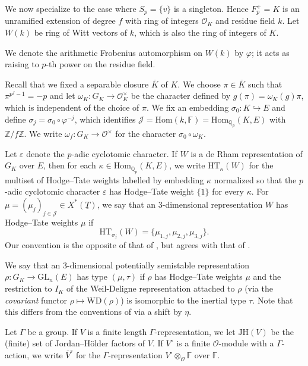 \documentclass[oneside,a4paper,english, 11pt]{amsart}
\theoremstyle{plain}
\theoremstyle{plain}
\theoremstyle{plain}
\theoremstyle{plain}
\theoremstyle{plain}
\theoremstyle{plain}
\theoremstyle{definition}
\theoremstyle{definition}
\theoremstyle{definition}
\theoremstyle{remark}
\numberwithin{equation}{section}
\newcommand{\Z}{\mathbb{Z}}
\newcommand{\Qp}{\mathbb{Q}_p}
\newcommand{\F}{\mathbb{F}}
\newcommand{\cJ}{\mathcal{J}}
\newcommand{\cO}{\mathcal{O}}
\newcommand{\eps}{\varepsilon}
\newcommand{\phz}{\varphi}
\newcommand{\Hom}{\mathrm{Hom}}
\newcommand{\GL}{\mathrm{GL}}
\newcommand{\un}[1]{\underline{#1}}
\newcommand{\JH}{\mathrm{JH}}
\newcommand{\ovl}[1]{\overline{#1}}
\newcommand{\ra}{\rightarrow}
\newcommand{\into}{\hookrightarrow}
\begin{document}
We now specialize to the case where $S_p=\{v\}$ is a singleton.
Hence $F^+_p=K$ is an unramified extension of degree $f$ with ring of integers $\cO_K$ and residue field $k$. 
Let $W(k)$ be ring of Witt vectors of $k$, which is also the ring of integers of $K$.  

We denote the arithmetic Frobenius automorphism on $W(k)$ by $\phz$; it acts as raising to $p$-th power on the residue field.

Recall that we fixed a separable closure $\ovl{K}$ of $K$.
We choose $\pi \in \ovl{K}$ such that $\pi^{p^f-1} = -p$ and let $\omega_K : G_K \ra \cO_K^\times$ be the character defined by $g(\pi) = \omega_K(g) \pi$, which is independent of the choice of $\pi$.
We fix an embedding $\sigma_0: K \into E$ and define $\sigma_j = \sigma_0 \circ \phz^{-j}$, which identifies $\cJ = \Hom(k, \F) = \Hom_{\Qp}(K, E)$ with $\Z/f \Z$. 
We write $\omega_f:G_K \ra \cO^\times$ for the character $\sigma_0 \circ \omega_K$.

%
%
%

Let $\eps$ denote the $p$-adic cyclotomic character.  
If $W$ is a de Rham representation of $G_K$ over $E$, then for each $\kappa \in \Hom_{\Qp}(K, E)$, we write $\mathrm{HT}_{\kappa}(W)$ for the multiset of Hodge--Tate weights labelled by embedding $\kappa$ normalized so that the $p$-adic cyclotomic character $\eps$ has Hodge--Tate weight $\{1\}$ for every $\kappa$.  For $\mu = (\mu_j)_{j\in\cJ} \in X^*(\un{T})$, we say that an $3$-dimensional representation $W$ has Hodge--Tate weights $\mu$ if 
\[
\mathrm{HT}_{\sigma_j}(W) = \{ \mu_{1, j}, \mu_{2, j}, \mu_{3, j} \}.
\]
Our convention is the opposite of that of \cite{EGstack,CEGGPS}, but agrees with that of \cite{GHS}.

We say that an $3$-dimensional potentially semistable representation $\rho:G_K \ra \GL_n(E)$ has type $(\mu, \tau)$ if $\rho$ has Hodge--Tate weights $\mu$ and the restriction to $I_K$ of the Weil-Deligne representation attached to $\rho$ (via the \emph{covariant} functor $\rho\mapsto\mathrm{WD}(\rho)$) is isomorphic to the inertial type $\tau$. 
Note that this differs from the conventions of \cite{GHS} via a shift by $\eta$. 



Let $\Gamma$ be a group.
If $V$ is a finite length $\Gamma$-representation, we let $\JH(V)$ be the (finite) set of Jordan--H\"older factors of $V$.
If $V^\circ$ is a finite $\cO$-module with a $\Gamma$-action, we write $\ovl{V}^\circ$ for the $\Gamma$-representation $V^\circ\otimes_{\cO}\F$ over $\F$.
\end{document}
